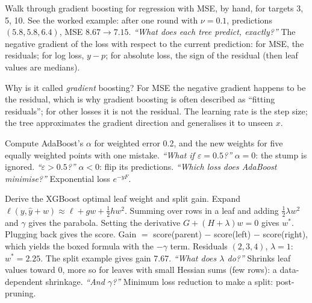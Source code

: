 \begin{qa}{Walk through gradient boosting for regression with MSE, by hand, for targets 3, 5, 10.}
\why See the worked example: after one round with $\nu = 0.1$, predictions $(5.8, 5.8, 6.4)$, MSE $8.67\to7.15$.
\pushes \emph{``What does each tree predict, exactly?''} The negative gradient of the loss with respect to the current prediction: for
MSE, the residuals; for log loss, $y - p$; for absolute loss, the sign of the residual (then leaf values are medians).
\end{qa}

\begin{qa}{Why is it called \emph{gradient} boosting?}
\why For MSE the negative gradient happens to be the residual, which is why gradient boosting is often described as ``fitting
residuals''; for other losses it is not the residual. The learning rate is the step size; the tree approximates the gradient direction
and generalises it to unseen $x$.
\end{qa}

\begin{qa}{Compute AdaBoost's $\alpha$ for weighted error 0.2, and the new weights for five equally weighted points with one mistake.}
\pushes \emph{``What if $\varepsilon = 0.5$?''} $\alpha = 0$: the stump is ignored. \emph{``$\varepsilon > 0.5$?''} $\alpha < 0$: flip its
predictions. \emph{``Which loss does AdaBoost minimise?''} Exponential loss $e^{-yF}$.
\end{qa}

\begin{qa}{Derive the XGBoost optimal leaf weight and split gain.}
\why Expand $\ell(y, \hat y + w) \approx \ell + gw + \frac12hw^2$. Summing over rows in a leaf and adding $\frac12\lambda w^2$ and $\gamma$
gives the parabola. Setting the derivative $G + (H + \lambda)w = 0$ gives $w^*$. Plugging back gives the score. Gain $=$ score(parent)
$-$ score(left) $-$ score(right), which yields the boxed formula with the $-\gamma$ term.
\worked Residuals $(2,3,4)$, $\lambda=1$: $w^* = 2.25$. The split example gives gain 7.67.
\pushes \emph{``What does $\lambda$ do?''} Shrinks leaf values toward 0, more so for leaves with small Hessian sums (few rows): a
data-dependent shrinkage. \emph{``And $\gamma$?''} Minimum loss reduction to make a split: post-pruning.
\end{qa}

